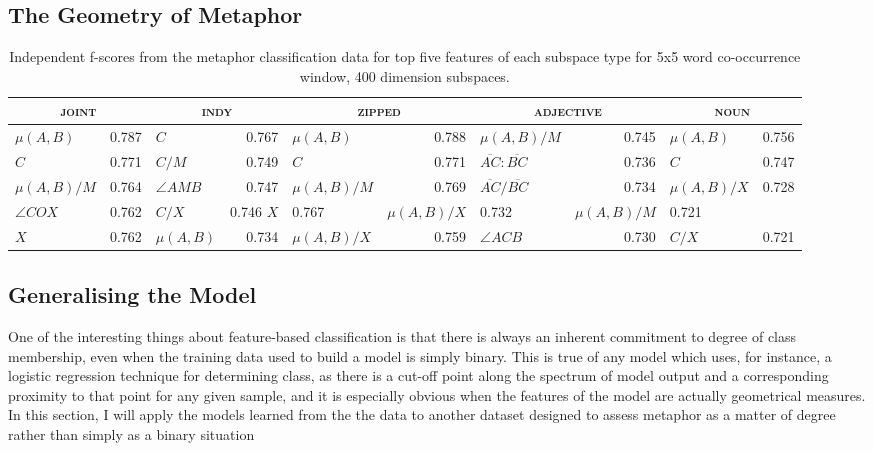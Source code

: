 \subsection{The Geometry of Metaphor}
\begin{table}
\centering
\begin{tabular}{lr|lr|lr|lr|lr}
\hline
\multicolumn{2}{c}{\textsc{joint}} & \multicolumn{2}{c}{\textsc{indy}} & \multicolumn{2}{c}{\textsc{zipped}} & \multicolumn{2}{c}{\textsc{adjective}} & \multicolumn{2}{c}{\textsc{noun}} \\
\hline
$\mu(A,B)$ & 0.787 & $C$ & 0.767 & $\mu(A,B)$ & 0.788 & $\mu(A,B)/M$ & 0.745 & $\mu(A,B)$ & 0.756 \\
$C$ & 0.771 & $C/M$ & 0.749 & $C$ & 0.771 & $\overline{AC}:\overline{BC}$ & 0.736 & $C$ & 0.747 \\
$\mu(A,B)/M$ & 0.764 & $\angle AMB$ & 0.747 & $\mu(A,B)/M$ & 0.769 & $\overline{AC}/\overline{BC}$ & 0.734 & $\mu(A,B)/X$ & 0.728 \\
$\angle COX$ & 0.762 & $C/X$ & 0.746 $X$ & 0.767 & $\mu(A,B)/X$ & 0.732 & $\mu(A,B)/M$ & 0.721 \\
$X$ & 0.762 & $\mu(A,B)$ & 0.734 & $\mu(A,B)/X$ & 0.759 & $\angle ACB$ & 0.730 & $C/X$ & 0.721 \\
\hline
\end{tabular}
\caption{Independent f-scores from the metaphor classification data for top five features of each subspace type for 5x5 word co-occurrence window, 400 dimension subspaces.}
\label{tab:ind-metaphor}
\end{table}

\subsection{Generalising the Model} \label{sec:genaphor}
One of the interesting things about feature-based classification is that there is always an inherent commitment to degree of class membership, even when the training data used to build a model is simply binary.  This is true of any model which uses, for instance, a logistic regression technique for determining class, as there is a cut-off point along the spectrum of model output and a corresponding proximity to that point for any given sample, and it is especially obvious when the features of the model are actually geometrical measures.  In this section, I will apply the models learned from the the \cite{GutierrezEA2016} data to another dataset designed to assess metaphor as a matter of degree rather than simply as a binary situation

